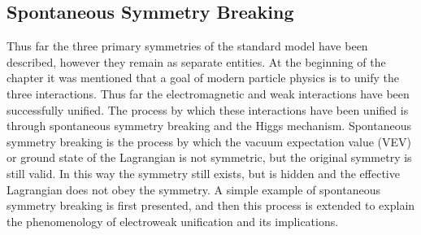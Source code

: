 \subsection{Spontaneous Symmetry Breaking}
\label{sec:breaking}
Thus far the three primary symmetries of the standard model have been described, however they remain as separate entities.
At the beginning of the chapter it was mentioned that a goal of modern particle physics is to unify the three interactions. 
Thus far the electromagnetic and weak interactions have been successfully unified.
The process by which these interactions have been unified is through spontaneous symmetry breaking and the Higgs mechanism.
Spontaneous symmetry breaking is the process by which the vacuum expectation value (VEV) or ground state of the Lagrangian is not symmetric, but the original symmetry is still valid.
In this way the symmetry still exists, but is hidden and the effective Lagrangian does not obey the symmetry.
A simple example of spontaneous symmetry breaking is first presented, and then this process is extended to explain the phenomenology of electroweak unification and its implications.

